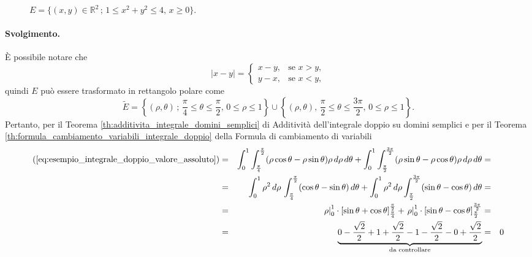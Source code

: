\begin{example}
\begin{figure}
			\caption{$E=\{(x,y)\in\mathbb R^2\,;\, 1\leq x^2+y^2\leq 4,\, x\geq 0\}$.}
			\label{fig:dominio_integrale_semicerchio}
		\end{figure}
	
	\paragraph{Svolgimento.} È possibile notare che
	\begin{equation*}
		|x-y|=
		\begin{cases}
			x-y, & \text{se } x>y,\\
			y-x, & \text{se } x<y,
		\end{cases}
	\end{equation*}
	quindi $E$ può essere trasformato in rettangolo polare come
	\begin{equation*}
		\tilde E = \left\{ (\rho,\theta)\,;\, \frac{\pi}{4}\leq \theta\leq \frac{\pi}{2},\, 0\leq \rho\leq 1\right\}  \cup\left\{(\rho,\theta),\, \frac{\pi}{2}\leq \theta\leq \frac{3\pi}{2},\, 0\leq \rho\leq 1\right\}.
	\end{equation*}
	Pertanto, per il Teorema \ref{th:additivita_integrale_domini_semplici} di Additività dell'integrale doppio su domini semplici e per il Teorema \ref{th:formula_cambiamento_variabili_integrale_doppio} della Formula di cambiamento di variabili
	\begin{equation*}
		\begin{aligned}
			(\ref{eq:esempio_integrale_doppio_valore_assoluto}) &=& \int_0^1\int_{\frac{\pi}{4}}^{\frac{\pi}{2}} (\rho\cos\theta - \rho\sin\theta)\rho\, d\rho\, d\theta + \int_0^1\int_{\frac{\pi}{2}}^{\frac{3\pi}{2}} (\rho\sin\theta - \rho\cos\theta)\rho\, d\rho\, d\theta &=&\\
			&=& \int_0^1\rho^2\, d\rho\,\int_{\frac{\pi}{4}}^{\frac{\pi}{2}} (\cos\theta - \sin\theta)\,d\theta + \int_0^1\rho^2\, d\rho \int_{\frac{\pi}{2}}^{\frac{3\pi}{2}} (\sin\theta - \cos\theta)\, d\theta &=&\\
			&=& \left.\rho\right\rvert_{0}^{1}\cdot [\sin\theta + \cos\theta]_{\frac{\pi}{4}}^{\frac{\pi}{2}} + \left.\rho\right\rvert_{0}^{1}\cdot [\sin\theta - \cos\theta]_{\frac{\pi}{2}}^{\frac{3\pi}{2}} &=&\\
			&=& \underbrace{0 - \frac{\sqrt{2}}{2} + 1 +  \frac{\sqrt{2}}{2} - 1 - \frac{\sqrt{2}}{2} - 0 + \frac{\sqrt{2}}{2} }_{\text{da controllare}} &=& 0
		\end{aligned}
	\end{equation*}
\end{example}